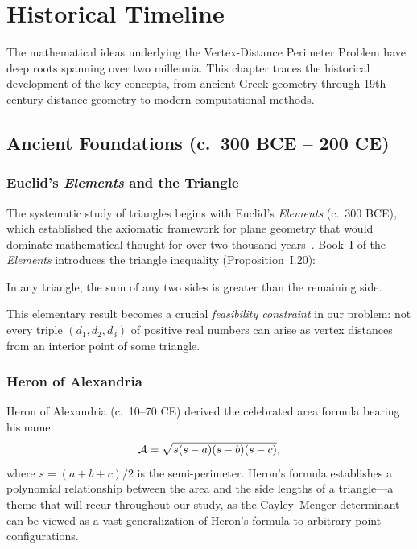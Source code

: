 
\chapter{Historical Timeline}
\label{ch:history}

The mathematical ideas underlying the Vertex-Distance Perimeter Problem have deep roots spanning over two millennia. This chapter traces the historical development of the key concepts, from ancient Greek geometry through 19th-century distance geometry to modern computational methods.

\section{Ancient Foundations (c.~300 BCE -- 200 CE)}

\subsection{Euclid's \emph{Elements} and the Triangle}

The systematic study of triangles begins with Euclid's \emph{Elements} (c.~300 BCE), which established the axiomatic framework for plane geometry that would dominate mathematical thought for over two thousand years~\citep{euclid_elements}. Book~I of the \emph{Elements} introduces the triangle inequality (Proposition~I.20):

\begin{theorem}
In any triangle, the sum of any two sides is greater than the remaining side.
\end{theorem}

This elementary result becomes a crucial \emph{feasibility constraint} in our problem: not every triple $(d_1, d_2, d_3)$ of positive real numbers can arise as vertex distances from an interior point of some triangle.

\subsection{Heron of Alexandria}

Heron of Alexandria (c.~10--70 CE) derived the celebrated area formula bearing his name:
\begin{equation}
\mathcal{A} = \sqrt{s(s-a)(s-b)(s-c)},
\end{equation}
where $s = (a+b+c)/2$ is the semi-perimeter. Heron's formula establishes a polynomial relationship between the area and the side lengths of a triangle---a theme that will recur throughout our study, as the Cayley--Menger determinant can be viewed as a vast generalization of Heron's formula to arbitrary point configurations.

